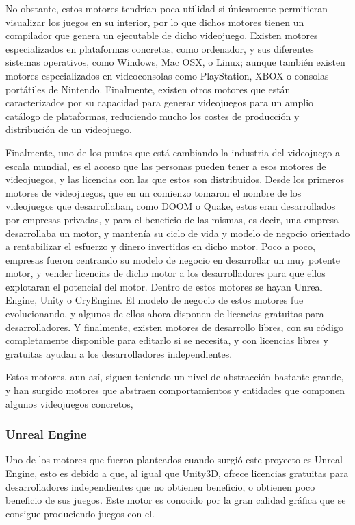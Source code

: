 No obstante, estos motores tendrían poca utilidad si únicamente permitieran visualizar los juegos en su interior, por lo que dichos motores tienen un compilador que genera un ejecutable de dicho videojuego. Existen motores especializados en plataformas concretas, como ordenador, y sus diferentes sistemas operativos, como Windows, Mac OSX, o Linux; aunque también existen motores especializados en videoconsolas como PlayStation, XBOX o consolas portátiles de Nintendo. Finalmente, existen otros motores que están caracterizados por su capacidad para generar videojuegos para un amplio catálogo de plataformas, reduciendo mucho los costes de producción y distribución de un videojuego.

Finalmente, uno de los puntos que está cambiando la industria del videojuego a escala mundial, es el acceso que las personas pueden tener a esos motores de videojuegos, y las licencias con las que estos son distribuidos. Desde los primeros motores de videojuegos, que en un comienzo tomaron el nombre de los videojuegos que desarrollaban, como DOOM o Quake, estos eran desarrollados por empresas privadas, y para el beneficio de las mismas, es decir, una empresa desarrollaba un motor, y mantenía su ciclo de vida y modelo de negocio orientado a rentabilizar el esfuerzo y dinero invertidos en dicho motor. Poco a poco, empresas fueron centrando su modelo de negocio en desarrollar un muy potente motor, y vender licencias de dicho motor a los desarrolladores para que ellos explotaran el potencial del motor. Dentro de estos motores se hayan Unreal Engine, Unity o CryEngine. El modelo de negocio de estos motores fue evolucionando, y algunos de ellos ahora disponen de licencias gratuitas para desarrolladores. Y finalmente, existen motores de desarrollo libres, con su código completamente disponible para editarlo si se necesita, y con licencias libres y gratuitas ayudan a los desarrolladores independientes.

Estos motores, aun así, siguen teniendo un nivel de abstracción bastante grande, y han surgido motores que abstraen comportamientos y entidades que componen algunos videojuegos concretos, 

\subsubsection{Unreal Engine}

Uno de los motores que fueron planteados cuando surgió este proyecto es Unreal Engine, esto es debido a que, al igual que Unity3D, ofrece licencias gratuitas para desarrolladores independientes que no obtienen beneficio, o obtienen poco beneficio de sus juegos. Este motor es conocido por la gran calidad gráfica que se consigue produciendo juegos con el.

